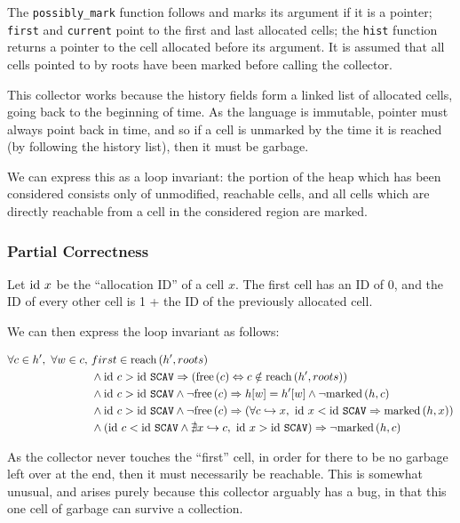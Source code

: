 The \texttt{possibly\_mark} function follows and marks its argument if
it is a pointer; \texttt{first} and \texttt{current} point to the
first and last allocated cells; the \texttt{hist} function returns a
pointer to the cell allocated before its argument. It is assumed that
all cells pointed to by roots have been marked before calling the
collector.

This collector works because the history fields form a linked list of
allocated cells, going back to the beginning of time. As the language
is immutable, pointer must always point back in time, and so if a cell
is unmarked by the time it is reached (by following the history list),
then it must be garbage.

We can express this as a loop invariant: the portion of the heap which
has been considered consists only of unmodified, reachable cells, and
all cells which are directly reachable from a cell in the considered
region are marked.

\subsubsection{Partial Correctness}
\label{sec:marksweep-example-partial}

Let $\mathrm{id}~x$ be the ``allocation ID'' of a cell $x$. The first cell has
an ID of 0, and the ID of every other cell is 1 + the ID of the
previously allocated cell.

We can then express the loop invariant as follows:

\begin{align*}
  \forall c \in h',\ \forall w \in c,\ &first \in \reach{h'}{roots}\\
%
  &\land \id~c > \id~\mathtt{SCAV} \implies (\free{c}
    \iff c \notin \reach{h'}{roots})\\
%
  &\land \id~c > \id~\mathtt{SCAV} \land \lnot\free{c}
    \implies h[w] = h'[w] \land \lnot \marked{h}{c}\\
%
  &\land \id~c > \id~\mathtt{SCAV} \land \lnot\free{c}
    \implies (\forall c \pointsto x,\ \id~x < \id~\mathtt{SCAV}
    \implies \marked{h}{x})\\
%
  &\land \left(\id~c < \id~\mathtt{SCAV} \land \nexists x \pointsto
    c,\ \id~x > \id~\mathtt{SCAV}\right) \implies \lnot\marked{h}{c}
\end{align*}

As the collector never touches the ``first'' cell, in order for there
to be no garbage left over at the end, then it must necessarily be
reachable. This is somewhat unusual, and arises purely because this
collector arguably has a bug, in that this one cell of garbage can
survive a collection.

